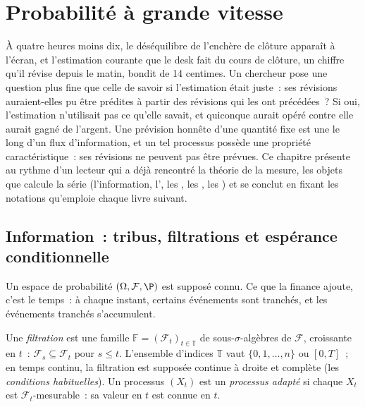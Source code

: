 \chapter{Probabilité à grande vitesse}\label{ch:qm:probability-at-speed}

À quatre heures moins dix, le déséquilibre de l'enchère de clôture apparaît à l'écran, et l'estimation courante que le desk
fait du cours de clôture, un chiffre qu'il révise depuis le matin, bondit de 14
centimes. Un chercheur pose une question plus fine que celle de savoir si l'estimation était juste~: ses révisions auraient-elles pu
être prédites à partir des révisions qui les ont précédées~? Si oui, l'estimation n'utilisait pas ce qu'elle savait, et quiconque aurait
opéré contre elle aurait gagné de l'argent. Une prévision honnête
d'une quantité fixe est une  le long d'un flux d'information, et un tel processus possède
une propriété caractéristique~: ses révisions ne peuvent pas être prévues. Ce chapitre présente
au rythme d'un lecteur qui a déjà rencontré la théorie de la mesure, les objets que calcule la série
(l'information, l', les , les , les )
et se conclut en fixant les notations qu'emploie chaque livre suivant.

\section{Information~: tribus, filtrations et espérance conditionnelle}

Un espace de probabilité $(\Omega, \mathcal F, \P)$ est supposé connu. Ce que la finance ajoute,
c'est le temps~: à chaque instant, certains événements sont tranchés, et les événements tranchés s'accumulent.

\begin{definition}\label{def:qm:probability-at-speed:filtration}
Une \emph{filtration} est une famille $\mathbb F = (\mathcal F_t)_{t \in
\mathbb T}$ de sous-$\sigma$-algèbres de $\mathcal F$, croissante en $t$~: $\mathcal F_s
\subseteq \mathcal F_t$ pour $s \le t$. L'ensemble d'indices $\mathbb T$ vaut $\{0, 1, \dots, n\}$ ou
$[0, T]$~; en temps continu, la filtration est supposée continue à droite et complète (les
\emph{conditions habituelles}). Un processus $(X_t)$ est un \emph{processus adapté}
si chaque $X_t$ est $\mathcal F_t$-mesurable~: sa valeur en $t$ est connue en $t$.
\end{definition}

